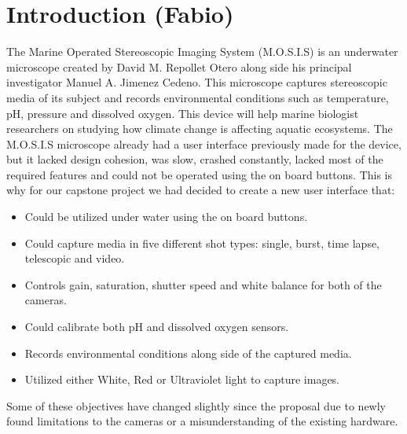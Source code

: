 \section{Introduction (Fabio)}
The Marine Operated Stereoscopic Imaging System (M.O.S.I.S) is an underwater microscope created by David M. Repollet Otero along side his principal investigator Manuel A. Jimenez Cedeno. This microscope captures stereoscopic media of its subject and records environmental conditions such as temperature, pH, pressure and dissolved oxygen. This device will help marine biologist researchers on studying how climate change is affecting aquatic ecosystems. The M.O.S.I.S microscope already had a user interface previously made for the device, but it lacked design cohesion, was slow, crashed constantly, lacked most of the required features and could not be operated using the on board buttons. This is why for our capstone project we had decided to create a new user interface that:
\begin{itemize}
	\item Could be utilized under water using the on board buttons.
	\item Could capture media in five different shot types: single, burst, time lapse, telescopic and video.
	\item Controls gain, saturation, shutter speed and white balance for both of the cameras.
	\item Could calibrate both pH and dissolved oxygen sensors.
	\item Records environmental conditions along side of the captured media.
	\item Utilized either White, Red or Ultraviolet light to capture images.
\end{itemize}
Some of these objectives have changed slightly since the proposal due to newly found limitations to the cameras or a misunderstanding of the existing hardware.\\
